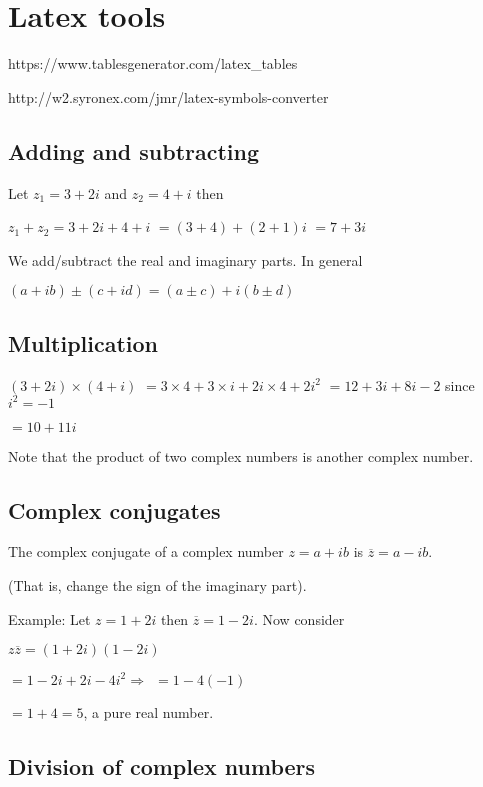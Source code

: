 \documentclass{extarticle}
\begin{document}
\section{Latex tools}

https://www.tablesgenerator.com/latex\_tables

http://w2.syronex.com/jmr/latex-symbols-converter

\subsection{Adding and subtracting}

Let $z_1=3+2i$ and $z_2=4+i$ then

$z_1+z_2=3+2i+4+i$
$=\left(3+4\right)+\left(2+1\right)i$
$=7+3i$


We add/subtract the real and imaginary parts.
In general

$\left(a+ib\right)\pm\left(c+id\right)=\left(a\pm c\right)+i\left(b\pm d\right)$

\subsection{Multiplication}

$\left(3+2i\right)\times\left(4+i\right)$ $=3\times4+3\times i+2i\times4+2i^2$ $=12+3i+8i-2$
since $i^2=-1$

$=10+11i$

Note that the product of two complex numbers is another complex number.


\subsection{Complex conjugates}

The complex conjugate of a complex number $z=a+ib$ is $\overline{z}=a-ib$. 

(That is, change the sign of the imaginary part).

Example: Let $z=1+2i$ then $\overline{z}=1-2i$. Now consider

$z\overline{z}=\left(1+2i\right)\left(1-2i\right)$

$=1-2i+2i-4i^2\Rightarrow\ \ =1-4\left(-1\right)$

$=1+4=5$, a pure real number.



\subsection{Division of complex numbers}
\end{document}
